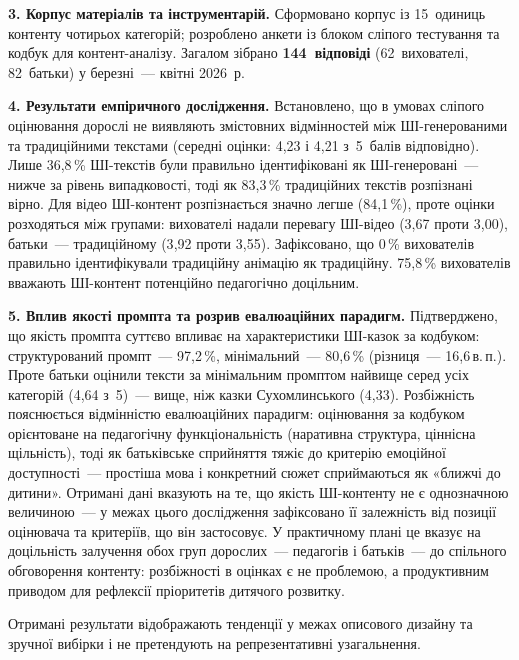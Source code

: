 \documentclass[14pt, a4paper]{extreport}
\begin{document}
\textbf{3. Корпус матеріалів та інструментарій.}
Сформовано корпус із 15~одиниць контенту чотирьох категорій; розроблено анкети із блоком сліпого тестування та кодбук для контент-аналізу. Загалом зібрано \textbf{144~відповіді} (62~вихователі, 82~батьки) у березні~--- квітні 2026~р.

\textbf{4. Результати емпіричного дослідження.}
Встановлено, що в умовах сліпого оцінювання дорослі не виявляють змістовних відмінностей між ШІ-генерованими та традиційними текстами (середні оцінки: 4{,}23 і 4{,}21 з~5~балів відповідно). Лише 36{,}8\,\% ШІ-текстів були правильно ідентифіковані як ШІ-генеровані~--- нижче за рівень випадковості, тоді як 83{,}3\,\% традиційних текстів розпізнані вірно. Для відео ШІ-контент розпізнається значно легше (84{,}1\,\%), проте оцінки розходяться між групами: вихователі надали перевагу ШІ-відео (3{,}67 проти 3{,}00), батьки~--- традиційному (3{,}92 проти 3{,}55). Зафіксовано, що 0\,\% вихователів правильно ідентифікували традиційну анімацію як традиційну. 75{,}8\,\% вихователів вважають ШІ-контент потенційно педагогічно доцільним.

\textbf{5. Вплив якості промпта та розрив евалюаційних парадигм.}
Підтверджено, що якість промпта суттєво впливає на характеристики ШІ-казок за кодбуком: структурований промпт~--- 97{,}2\,\%, мінімальний~--- 80{,}6\,\% (різниця~--- 16{,}6\,в.\,п.). Проте батьки оцінили тексти за мінімальним промптом найвище серед усіх категорій (4{,}64 з~5)~--- вище, ніж казки Сухомлинського (4{,}33). Розбіжність пояснюється відмінністю евалюаційних парадигм: оцінювання за кодбуком орієнтоване на педагогічну функціональність (наративна структура, ціннісна щільність), тоді як батьківське сприйняття тяжіє до критерію емоційної доступності~--- простіша мова і конкретний сюжет сприймаються як «ближчі до дитини». Отримані дані вказують на те, що якість ШІ-контенту не є однозначною величиною~--- у межах цього дослідження зафіксовано її залежність від позиції оцінювача та критеріїв, що він застосовує. У практичному плані це вказує на доцільність залучення обох груп дорослих~--- педагогів і батьків~--- до спільного обговорення контенту: розбіжності в оцінках є не проблемою, а продуктивним приводом для рефлексії пріоритетів дитячого розвитку.

Отримані результати відображають тенденції у межах описового дизайну та зручної вибірки і не претендують на репрезентативні узагальнення.
\end{document}
